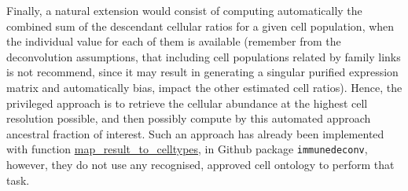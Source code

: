 Finally, a natural extension would consist of computing automatically the combined sum of the descendant cellular ratios for a given cell population, when the individual value for each of them is available (remember from the deconvolution assumptions, that including cell populations related by family links is not recommend, since it may result in generating a singular purified expression matrix and automatically bias, impact the other estimated cell ratios). Hence, the privileged approach is to retrieve the cellular abundance at the highest cell resolution possible, and then possibly compute by this automated approach ancestral fraction of interest. Such an approach has already been implemented with function \href{https://omnideconv.org/immunedeconv/reference/map_result_to_celltypes.html}{map\_result\_to\_celltypes}, in Github package \texttt{immunedeconv}, however, they do not use any recognised, approved cell ontology to perform that task.










